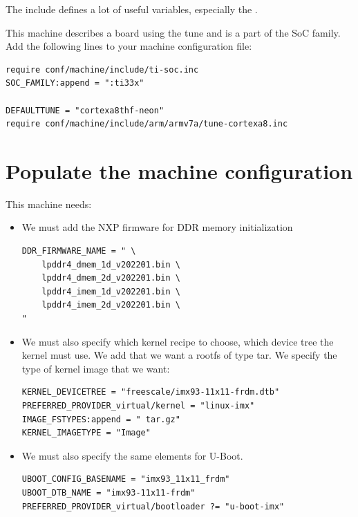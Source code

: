 The  include defines a lot of useful variables, especially
the .
\fi

\if{}
This machine describes a board using the  tune
and is a part of the  SoC family. Add the following lines
to your machine configuration file:

\begin{verbatim}
require conf/machine/include/ti-soc.inc
SOC_FAMILY:append = ":ti33x"

DEFAULTTUNE = "cortexa8thf-neon"
require conf/machine/include/arm/armv7a/tune-cortexa8.inc
\end{verbatim}
\fi

\section{Populate the machine configuration}

This  machine needs:

\if{}
\begin{itemize}
  \item We must add the NXP firmware for DDR memory initialization
\begin{verbatim}
DDR_FIRMWARE_NAME = " \
    lpddr4_dmem_1d_v202201.bin \
    lpddr4_dmem_2d_v202201.bin \
    lpddr4_imem_1d_v202201.bin \
    lpddr4_imem_2d_v202201.bin \
"
\end{verbatim}

  \item We must also specify which kernel recipe to choose, which device tree the kernel must use. We add that we want a rootfs of type tar. We specify the type of kernel image that we want:
\begin{verbatim}
KERNEL_DEVICETREE = "freescale/imx93-11x11-frdm.dtb"
PREFERRED_PROVIDER_virtual/kernel = "linux-imx"
IMAGE_FSTYPES:append = " tar.gz"
KERNEL_IMAGETYPE = "Image"

\end{verbatim}

  \item We must also specify the same elements for U-Boot.
\begin{verbatim}
UBOOT_CONFIG_BASENAME = "imx93_11x11_frdm"
UBOOT_DTB_NAME = "imx93-11x11-frdm"
PREFERRED_PROVIDER_virtual/bootloader ?= "u-boot-imx"
\end{verbatim}
\end{itemize}
\fi



